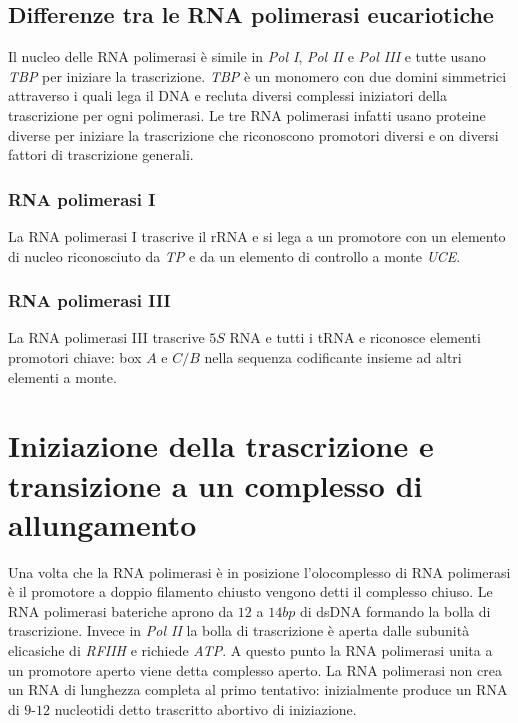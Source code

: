 \subsection{Differenze tra le RNA polimerasi eucariotiche}
Il nucleo delle RNA polimerasi \`e simile in \emph{Pol I}, \emph{Pol II} e \emph{Pol III} e tutte usano \emph{TBP} per iniziare la trascrizione. \emph{TBP} \`e un monomero con 
due domini simmetrici attraverso i quali lega il DNA e recluta diversi complessi iniziatori della trascrizione per ogni polimerasi. Le tre RNA polimerasi infatti usano proteine diverse
per iniziare la trascrizione che riconoscono promotori diversi e on diversi fattori di trascrizione generali. 
\subsubsection{RNA polimerasi I}
La RNA polimerasi I trascrive il rRNA e si lega a un promotore con un elemento di nucleo riconosciuto da \emph{TP} e da un elemento di controllo a monte \emph{UCE}. 
\subsubsection{RNA polimerasi III}
La RNA polimerasi III trascrive $5S$ RNA e tutti i tRNA e riconosce elementi promotori chiave: box $A$ e $C/B$ nella sequenza codificante insieme ad altri elementi a monte.
\section{Iniziazione della trascrizione e transizione a un complesso di allungamento}
Una volta che la RNA polimerasi \`e in posizione l'olocomplesso di RNA polimerasi \`e il promotore a doppio filamento chiusto vengono detti il complesso chiuso. Le RNA polimerasi 
bateriche aprono da $12$ a $14bp$ di dsDNA formando la bolla di trascrizione. Invece in \emph{Pol II} la bolla di trascrizione \`e aperta dalle subunit\`a elicasiche di \emph{RFIIH} e 
richiede \emph{ATP}. A questo punto la RNA polimerasi unita a un promotore aperto viene detta complesso aperto. La RNA polimerasi non crea un RNA di lunghezza completa al primo 
tentativo: inizialmente produce un RNA di $9$-$12$ nucleotidi detto trascritto abortivo di iniziazione. 
